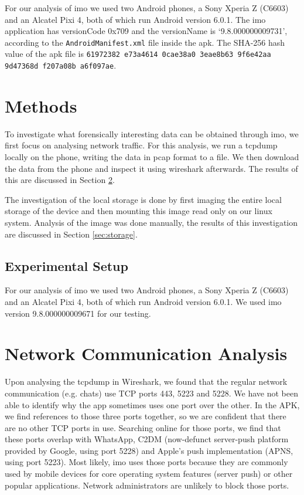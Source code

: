 \documentclass[conference]{IEEEtran}
\begin{document}
For our analysis of imo we used two Android phones, a Sony Xperia Z (C6603) and
an Alcatel Pixi 4, both of which run Android version 6.0.1. The imo application
has versionCode 0x709 and the versionName is `9.8.000000009731', according to
the \texttt{AndroidManifest.xml} file inside the apk. The SHA-256 hash value of
the apk file is \texttt{61972382 e73a4614 0cae38a0 3eae8b63 9f6e42aa 9d47368d
f207a08b a6f097ae}.


\section{Methods}\label{sec:method}

To investigate what forensically interesting data can be obtained through imo,
we first focus on analysing network traffic. For this analysis, we run a tcpdump
locally on the phone, writing the data in pcap format to a file. We then download
the data from the phone and inspect it using wireshark afterwards. The
results of this are discussed in Section \ref{sec:network}.

The investigation of the local storage is done by first imaging the entire local
storage of the device and then mounting this image read only on our linux
system. Analysis of the image was done manually, the results of this
investigation are discussed in Section \ref{sec:storage}.


\subsection{Experimental Setup}

For our analysis of imo we used two Android phones, a Sony Xperia Z (C6603) and
an Alcatel Pixi 4, both of which run Android version 6.0.1. We used imo
version 9.8.000000009671 for our testing.

\section{Network Communication Analysis}\label{sec:network}

Upon analysing the tcpdump in Wireshark, we found that the regular network
communication (e.g. chats) use TCP ports 443, 5223 and 5228. We have not been
able to identify why the app sometimes uses one port over the other. In the APK,
we find references to those three ports together, so we are confident that there
are no other TCP ports in use.  Searching online for those ports, we find that
these ports overlap with WhatsApp, C2DM (now-defunct server-push platform
provided by Google, using port 5228) and Apple's push implementation (APNS,
using port 5223). Most likely, imo uses those ports because they are commonly
used by mobile devices for core operating system features (server push) or other
popular applications. Network administrators are unlikely to block those ports.
\end{document}
